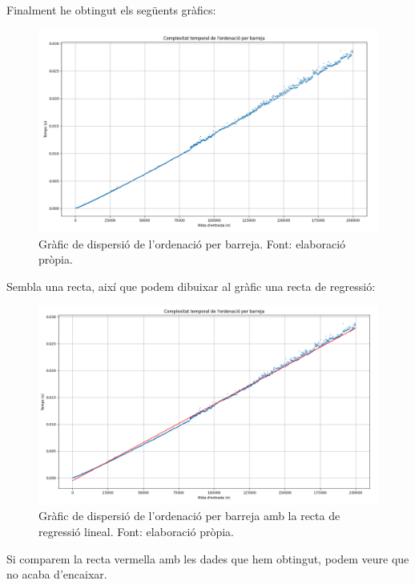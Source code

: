 \newpage
Finalment he obtingut els següents gràfics:
\begin{figure}[H]
    \centering
    \includegraphics[trim={0 0 0 45pt},clip,width=1\textwidth]{capitols/figures/mergescatter.png}
    \caption[Gràfic de dispersió de l'ordenació per barreja.]{Gràfic de dispersió de l'ordenació per barreja. Font: elaboració pròpia.}
    \label{fig:my_label}
\end{figure}
\vspace{-18pt}
Sembla una recta, així que podem dibuixar al gràfic una recta de regressió:
\begin{figure}[H]
    \centering
    \includegraphics[trim={0 0 0 38pt},clip,width=1\textwidth]{capitols/figures/mergescaterline.png}
    \caption[Gràfic de dispersió de l'ordenació per barreja amb la recta de regressió lineal.]{Gràfic de dispersió de l'ordenació per barreja amb la recta de regressió lineal. Font: elaboració pròpia.}
    \label{fig:my_label}
\end{figure}
Si comparem la recta vermella amb les dades que hem obtingut, podem veure que no acaba d'encaixar.

